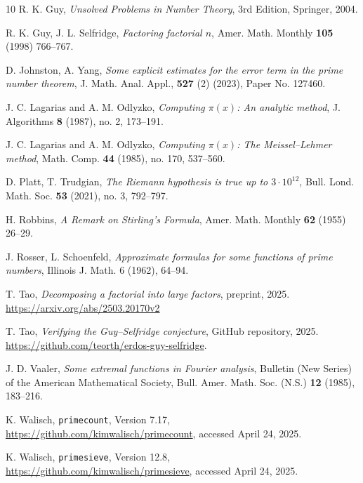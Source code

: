 \documentclass[10pt,a4paper,reqno]{amsart}
\numberwithin{equation}{section}
\theoremstyle{plain}
\theoremstyle{definition}
\begin{document}
\begin{thebibliography}{10}
R. K. Guy, \emph{Unsolved Problems in Number Theory}, 3rd Edition, Springer, 2004.

R. K. Guy, J. L. Selfridge, \emph{Factoring factorial $n$}, Amer. Math. Monthly \textbf{105} (1998) 766--767.

D. Johnston, A. Yang, \emph{Some explicit estimates for the error term in the prime number theorem}, J. Math. Anal. Appl., \textbf{527} (2) (2023), Paper No. 127460.

J. C. Lagarias and A. M. Odlyzko, \emph{Computing $\pi(x)$: An analytic method}, J. Algorithms \textbf{8} (1987), no. 2, 173--191.

J. C. Lagarias and A. M. Odlyzko, \emph{Computing $\pi(x)$: The Meissel--Lehmer method}, Math. Comp. \textbf{44} (1985), no. 170, 537--560.

D. Platt, T. Trudgian, \emph{The Riemann hypothesis is true up to $3\cdot10^{12}$}, Bull. Lond. Math. Soc. \textbf{53} (2021), no. 3, 792--797.

H. Robbins, \emph{A Remark on Stirling's Formula}, Amer. Math. Monthly \textbf{62} (1955) 26--29.


J. Rosser, L. Schoenfeld, \emph{Approximate formulas for some functions of prime numbers}, Illinois J. Math. 6 (1962), 64--94.

T. Tao, \emph{Decomposing a factorial into large factors}, preprint, 2025. \url{https://arxiv.org/abs/2503.20170v2}

T. Tao, \emph{Verifying the Guy--Selfridge conjecture}, GitHub repository, 2025.  \url{https://github.com/teorth/erdos-guy-selfridge}.

J. D. Vaaler, \emph{Some extremal functions in Fourier analysis}, Bulletin (New Series) of the American Mathematical Society, Bull. Amer. Math. Soc. (N.S.) \textbf{12} (1985), 183--216.

K. Walisch, \texttt{primecount}, Version 7.17, \url{https://github.com/kimwalisch/primecount}, accessed April 24, 2025.

K. Walisch, \texttt{primesieve}, Version 12.8, \url{https://github.com/kimwalisch/primesieve}, accessed April 24, 2025.

\end{thebibliography}
\end{document}
